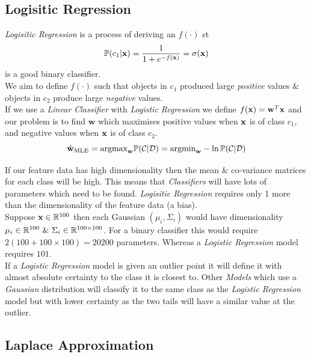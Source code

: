 \documentclass[11pt,a4paper]{article}
\begin{document}
\subsection{Logisitic Regression}

\textit{Logisitic Regression} is a process of deriving an $f(\cdot)$ st
$$\mathbb{P}(c_1|\textbf{x})=\frac{1}{1+e^{-f(\textbf{x})}}=\sigma(\textbf{x})$$
is a good binary classifier.\\
We aim to define $f(\cdot)$ such that objects in $c_1$ produced large \textit{positive} values \& objects in $c_2$ produce large \textit{negative} values.\\

If we use a \textit{Linear Classifier} with \textit{Logistic Regression} we define $f(\textbf{x})=\textbf{w}^T\textbf{x}$ and our problem is to find $\textbf{w}$ which maximises positive values when $\textbf{x}$ is of class $c_1$, and negative values when $\textbf{x}$ is of class $c_2$.
$$\hat{\textbf{w}}_\text{MLE}=\text{argmax}_\textbf{w}\mathbb{P}(\mathcal{C|D})=\text{argmin}_\textbf{w}-\ln\mathbb{P}(\mathcal{C|D})$$

If our feature data has high dimensionality then the mean \& co-variance matrices for each class will be high. This means that \textit{Classifiers} will have lots of parameters which need to be found. \textit{Logisitic Regression} requires only 1 more than the dimensionality of the feature data (a bias).\\

Suppose $\textbf{x}\in\mathbb{R}^{100}$ then each Gaussian $(\mu_i,\Sigma_i)$ would have dimensionality $\mu_i\in\reals^{100}\ \&\ \Sigma_i\in\reals^{100\times100}$. For a binary classifier this would require ${2(100+100\times100)=20200}$ parameters. Whereas a \textit{Logistic Regression} model requires $101$.\\

If a \textit{Logistic Regression} model is given an outlier point it will define it with almost absolute certainty to the class it is closest to. Other \textit{Models} which use a \textit{Gaussian} distribution will classify it to the same class as the \textit{Logistic Regression} model but with lower certainty as the two tails will have a similar value at the outlier.

\subsection{Laplace Approximation}
\end{document}
